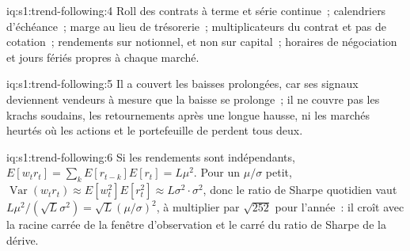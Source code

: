 \begin{solution}{iq:s1:trend-following:4}
Roll des contrats à terme et série continue~; calendriers d'échéance~; marge au lieu de trésorerie~; multiplicateurs du contrat et pas de cotation~; rendements sur notionnel, et non sur
capital~; horaires de négociation et jours fériés propres à chaque marché.
\end{solution}

\begin{solution}{iq:s1:trend-following:5}
Il a couvert les baisses prolongées, car ses signaux deviennent vendeurs à mesure que la baisse se prolonge~; il ne couvre pas les krachs soudains, les retournements après une longue hausse, ni
les marchés heurtés où les actions et le portefeuille de  perdent tous deux.
\end{solution}

\begin{solution}{iq:s1:trend-following:6}
Si les rendements sont indépendants, $E[w_t r_t] = \sum_{k} E[r_{t-k}]E[r_t] = L\mu^2$. Pour un $\mu/\sigma$ petit, $\operatorname{Var}(w_t r_t) \approx E[w_t^2]E[r_t^2]
\approx L\sigma^2 \cdot \sigma^2$, donc le ratio de Sharpe quotidien vaut $L\mu^2/(\sqrt{L}\sigma^2) = \sqrt{L}(\mu/\sigma)^2$, à multiplier par $\sqrt{252}$ pour l'année~: il croît
avec la racine carrée de la fenêtre d'observation et le carré du ratio de Sharpe de la dérive.
\end{solution}
